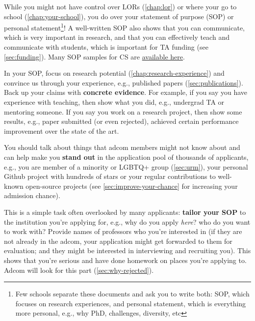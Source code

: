\documentclass[oneside,11pt,dvipsnames]{book}
\begin{document}
While you might not have control over LORs (\autoref{chap:lor}) or where your go to school (\autoref{chap:your-school}), you do over your
statement of purpose (SOP) or personal statement\footnote{Few schools separate these documents and ask you to write both: SOP, which focuses on research experiences, and personal statement, which is everything more personal, e.g., why PhD, challenges, diversity, etc}! A well-written SOP also shows that you can communicate, which is very important in research, and that you can effectively teach and communicate with students, which is important for TA funding (see \autoref{sec:funding}).  Many SOP samples for CS are \href{https://cs-sop.org/}{available here}.  


In your SOP, focus on research potential (\autoref{chap:research-experience}) and convince us through your experience, e.g., published papers (\autoref{sec:publications}). Back up your claims with \textbf{concrete evidence}. For example, if you say you have experience with teaching, then show what you did, e.g., undergrad TA or mentoring someone.  If you say you work on a research project, then show some results, e.g., paper submitted (or even rejected), achieved certain performance improvement over the state of the art. 


You should talk about things that adcom members might not know about and can help make you \textbf{stand out} in the application pool of thousands of applicants, e.g., you are member of a minority or LGBTQ+ group (\autoref{sec:urm}), your personal Github project with hundreds of stars or your regular contributions to well-known open-source projects (see \autoref{sec:improve-your-chance} for increasing your admission chance).


This is a simple task often overlooked by many applicants: \textbf{tailor your SOP} to the institution you're applying for,
e.g., why do you apply \emph{here}? who do you want to work with?
Provide names of professors who you're interested in (if they are not already in the adcom, your application might get forwarded to them for evaluation; and they might be interested in interviewing and recruiting you).
This shows that you're serious and have done homework on places you're applying to.
Adcom will look for this part (\autoref{sec:why-rejected}).
\end{document}
